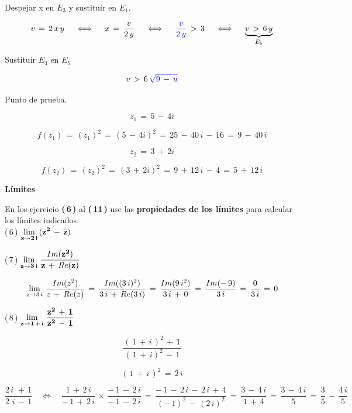 \documentclass[a4paper,11pt,openany]{book}
\begin{document}
\textcolor{ao(english)}{} Despejar x en $E_{3}$ y sustituir en $E_{1}$.

$$v\,=\,2\,x\,y \quad\iff\quad x\,=\,\dfrac{v}{2\,y} \quad\iff\quad \textcolor{ao}{\dfrac{v}{2\,y}}\,>\,3 \quad\iff\quad \underbrace{v\,>\,6\,y}_{E_{5}}$$

\textcolor{ao(english)}{} Sustituir $E_{4}$ en $E_{5}$

$$v\,>\,6\,\textcolor{ao}{\sqrt{9\,-\,u}}$$

\textcolor{ao(english)}{} Punto de prueba.

$$z_{1}\,=\,5\,-\,4i$$

$$f(z_{1})\,=\,(z_{1})^{2}\,=\,(5\,-\,4i)^{2}\,=\,25\,-\,40\,i\,-\,16\,=\,9\,-\,40\,i$$


$$z_{2}\,=\,3\,+\,2i$$

$$f(z_{2})\,=\,(z_{2})^{2}\,=\,(3\,+\,2i)^{2}\,=\,9\,+\,12\,i\,-\,4\,=\,5\,+\,12\,i$$

\begin{center}
\textbf{Límites}
\end{center}

En los ejercicio \textbf{(\,6\,)} al \textbf{(\,11\,)} use las \textbf{propiedades de los límites} para calcular los límites indicados.\\

\textcolor{ao(english)}{(\,6\,)} $\bf{\displaystyle\lim_{z \to 2\,i}\,(z^{2}\,-\,\overline{z})}$

\textcolor{ao(english)}{(\,7\,)} $\bf{\displaystyle\lim_{z \to 3\,i}\,\dfrac{\mathnormal{Im}(z^{2})}{z\,+\,\mathnormal{Re}(z)}}$

$$\displaystyle\lim_{z \to 3\,i}\,\dfrac{\mathnormal{Im}(z^{2})}{z\,+\,\mathnormal{Re}(z)}\,=\,\dfrac{\mathnormal{Im}((3\,i)^{2})}{3\,i\,+\,\mathnormal{Re}(3\,i)}\,=\,\dfrac{\mathnormal{Im}(9\,i^{2})}{3\,i\,+\,0}\,=\,\dfrac{\mathnormal{Im}(-\,9)}{3\,i}\,=\,\dfrac{0}{3\,i}\,=\,0$$

\textcolor{ao(english)}{(\,8\,)} $\bf{\displaystyle\lim_{z \to 1\,+\,i}\,\dfrac{z^{2}\,+\,1}{z^{2}\,-\,1}}$

$$\dfrac{(\,1\,+\,i\,)^{2}\,+\,1}{(\,1\,+\,i)^{2}\,-\,1}$$

$$(\,1\,+\,i\,)^{2}\,=\,2\,i$$

$$\dfrac{2\,i\,\,+\,1}{2\,\,i\,-\,1} \quad\iff\quad \dfrac{1\,+\,2\,i}{-\,1\,+\,2\,i}\,\times\,\dfrac{-\,1\,-\,2\,i}{-\,1\,-\,2\,i}\,=\,\dfrac{-\,1\,-\,2\,i\,-\,2\,i\,+\,4}{(-\,1)^{2}\,-\,(2\,i)^{2}}\,=\,\dfrac{3\,-\,4\,i}{1\,+\,4}\,=\,\dfrac{3\,-\,4\,i}{5}\,=\,\boxed{\dfrac{3}{5}\,-\,\dfrac{4\,i}{5}}$$
\end{document}
